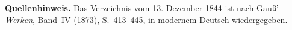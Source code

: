 \par\medskip\begin{small}\noindent\textbf{Quellenhinweis.} Das Verzeichnis vom 13. Dezember 1844 ist nach \href{https://gdz.sub.uni-goettingen.de/id/PPN236005081}{Gauß’ \textit{Werken}, Band~IV (1873), S.~413--445}, in modernem Deutsch wiedergegeben.\par\end{small}
